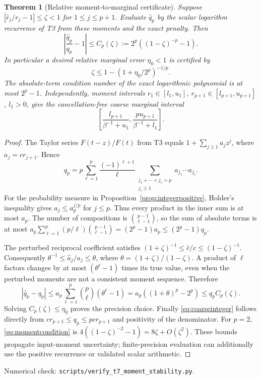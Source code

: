 \documentclass[11pt]{article}
\newtheorem{theorem}{Theorem}
\begin{document}
\begin{theorem}[Relative moment-to-marginal certificate]\label{thm:momentstability}
Suppose $|\widehat r_j/r_j-1|\leq\zeta<1$ for
$1\leq j\leq p+1$. Evaluate $\widehat q_p$ by the scalar logarithm
recurrence of T3 from these moments and the exact penalty. Then
\begin{equation}\label{eq:momentcondition}
 \left|\frac{\widehat q_p}{q_p}-1\right|
 \leq C_p(\zeta):=2^p((1-\zeta)^{-p}-1).
\end{equation}
In particular a desired relative marginal error $\eta_0<1$ is
certified by
\[
 \zeta\leq1-(1+\eta_0/2^p)^{-1/p}.
\]
The absolute-term condition number of the exact logarithmic
polynomial is at most $2^p-1$. Independently, moment intervals
$r_1\in[l_1,u_1]$, $r_{p+1}\in[l_{p+1},u_{p+1}]$, $l_1>0$,
give the cancellation-free coarse marginal interval
\begin{equation}\label{eq:coarseinteger}
 \left[\frac{l_{p+1}}{\beta^{-1}+u_1},
       \frac{p u_{p+1}}{\beta^{-1}+l_1}\right].
\end{equation}
\end{theorem}
\begin{proof}
The Taylor series $F(t-z)/F(t)$ from T3 equals
$1+\sum_{j\geq1}a_jz^j$, where $a_j=cr_{j+1}$.
Hence
\[
 q_p=p\sum_{\ell=1}^p\frac{(-1)^{\ell+1}}\ell
       \sum_{\substack{j_1+\cdots+j_\ell=p\\j_i\geq1}}
       a_{j_1}\cdots a_{j_\ell}.
\]
For the probability measure in Proposition~\ref{prop:integerpositive},
Holder's inequality gives $a_j\leq a_p^{j/p}$ for $j\leq p$.
Thus every product in the inner sum is at most $a_p$.
The number of compositions is $\binom{p-1}{\ell-1}$, so the sum
of absolute terms is at most
$a_p\sum_{\ell=1}^p(p/\ell)\binom{p-1}{\ell-1}
 =(2^p-1)a_p\leq(2^p-1)q_p$.

The perturbed reciprocal coefficient satisfies
$(1+\zeta)^{-1}\leq\widehat c/c\leq(1-\zeta)^{-1}$.
Consequently $\theta^{-1}\leq\widehat a_j/a_j\leq\theta$,
where $\theta=(1+\zeta)/(1-\zeta)$.
A product of $\ell$ factors changes by at most
$(\theta^\ell-1)$ times its true value, even when the perturbed
moments are not a consistent moment sequence. Therefore
\[
 |\widehat q_p-q_p|
 \leq a_p\sum_{\ell=1}^p\binom p\ell(\theta^\ell-1)
 =a_p((1+\theta)^p-2^p)\leq q_p C_p(\zeta).
\]
Solving $C_p(\zeta)\leq\eta_0$ proves the precision choice.
Finally \eqref{eq:coarseinteger} follows directly from
$cr_{p+1}\leq q_p\leq pcr_{p+1}$ and positivity of the denominator.
For $p=2$, \eqref{eq:momentcondition} is
$4((1-\zeta)^{-2}-1)=8\zeta+O(\zeta^2)$.
These bounds propagate input-moment uncertainty; finite-precision
evaluation can additionally use the positive recurrence or validated
scalar arithmetic.
\end{proof}
\noindent Numerical check: \texttt{scripts/verify\_t7\_moment\_stability.py}.
\end{document}

